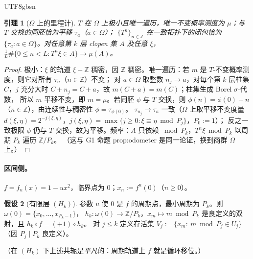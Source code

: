 \documentclass[11pt,a4paper]{article}
\newcommand{\Haar}{\mu}
\newcommand{\status}[1]{\par\noindent\fbox{\textbf{状态：#1}}\par\smallskip}
\newcommand{\Om}{\Omega}               %
\theoremstyle{plain}
\newtheorem{lem}{引理}[section]
\theoremstyle{definition}
\newtheorem{hyp}[lem]{假设}
\begin{document}
\begin{CJK}{UTF8}{gbsn}
\begin{lem}[$\Om$ 上的里程计]\label{g3:lem:odo}
$T$ 在 $\Om$ 上极小且唯一遍历，唯一不变概率测度为 $\Haar$；与 $T$ 交换的同胚恰为平移 $\tau_a$（$a\in\Om$）；
$\{T^n\}_{n\in\mathbb Z}$ 在一致拓扑下的闭包恰为 $\{\tau_a:a\in\Om\}$。对任意第 $k$ 层 clopen 集 $A$ 及任意 $\xi$，
$\frac1L\#\{0\le n<L:T^n\xi\in A\}\to\Haar(A)$。
\end{lem}
\status{已证}
\begin{proof}
极小：$\xi$ 的轨道 $\xi+\mathbb Z$ 稠密，因 $\mathbb Z$ 稠密。唯一遍历：若 $m$ 是 $T$-不变概率测度，则它对所有 $\tau_n$（$n\in\mathbb Z$）不变；
对 $a\in\Om$ 取整数 $n_j\to a$，对每个第 $k$ 层柱集 $C$，$j$ 充分大时 $C+n_j=C+a$，故 $m(C+a)=m(C)$；柱集生成 Borel $\sigma$-代数，
所以 $m$ 平移不变，即 $m=\Haar$。若同胚 $\phi$ 与 $T$ 交换，则 $\phi(n)=\phi(0)+n$（$n\in\mathbb Z$），由连续性与稠密性 $\phi=\tau_{\phi(0)}$。
$\tau_{n_j}\to\tau_a$ 一致（$\Om$ 上取平移不变度量 $d(\xi,\eta)=2^{-j(\xi,\eta)}$，$j(\xi,\eta)=\max\{j\ge0:\xi\equiv\eta\bmod P_j\}$，$P_0:=1$）；
反之一致极限 $\phi$ 仍与 $T$ 交换，故为平移。频率：$A$ 只依赖 $\bmod P_k$，$T^n\xi\bmod P_k$ 以周期 $P_k$ 遍历 $\mathbb Z/P_k$。
（这与 G1 命题 prop:odometer \cite{G1} 是同一论证，换到商群 $\Om$ 上。）
\end{proof}

\paragraph{区间侧。}
$f=f_u(x)=1-ux^2$，临界点为 $0$；$x_n:=f^n(0)$（$n\ge0$）。

\begin{hyp}[有限层 $(H_k)$]\label{g3:hyp:finite}
参数 $u$ 使 $0$ 是 $f$ 的周期点，最小周期为 $P_k$。则 $\omega(0)=\{x_0,\dots,x_{P_k-1}\}$，
$h_k:\omega(0)\to\mathbb Z/P_k$，$x_m\mapsto m\bmod P_k$ 是良定义的双射，且 $h_k\circ f=(+1)\circ h_k$。
对 $j\le k$ 定义存活集 $V_j:=\{x_m:\ m\bmod P_j\in U_j\}$（因 $P_j\mid P_k$ 良定义）。
\end{hyp}
（在 $(H_k)$ 下上述共轭是\emph{平凡}的：周期轨道上 $f$ 就是循环移位。）


\end{CJK}
\end{document}
